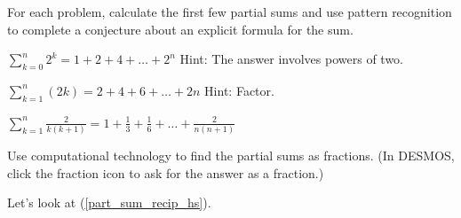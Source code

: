 \begin{act}
\label{act_sum_conj}
    For each problem, calculate the first few partial sums and use pattern recognition to complete a conjecture about an explicit formula for the sum.  
        \begin{actpart}
            \item $\displaystyle \sum_{k=0}^n2^k = 1+2+4+\ldots +2^n$
            Hint: The answer involves powers of two.          
            
            \item $\displaystyle \sum_{k=1}^n(2k)=2+4+6+ \ldots + 2n$ %
            Hint: Factor.     
            
            \item \label{part_sum_recip_hs} $\displaystyle \sum_{k=1}^n\frac{2}{k(k+1)}= 1 + \frac{1}{3} + \frac{1}{6} + \ldots+\frac{2}{n(n+1)}$
            
            Use computational technology to find the partial sums as fractions. (In DESMOS, click the fraction icon to ask for the answer as a fraction.)  
        \end{actpart}
\end{act}

Let's look at  (\ref{part_sum_recip_hs}).

